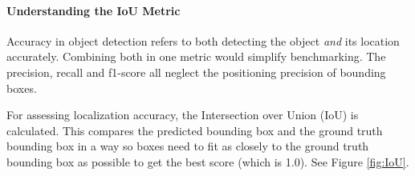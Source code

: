 \paragraph{Understanding the IoU Metric}

Accuracy in object detection refers to both detecting the object \textit{and} its location accurately. Combining both in one metric would simplify benchmarking. The precision, recall and f1-score all neglect the positioning precision of bounding boxes.

For assessing localization accuracy, the Intersection over Union (IoU) is calculated. This compares the predicted bounding box and the ground truth bounding box in a way so boxes need to fit as closely to the ground truth bounding box as possible to get the best score (which is 1.0). See Figure \ref{fig:IoU}. 

